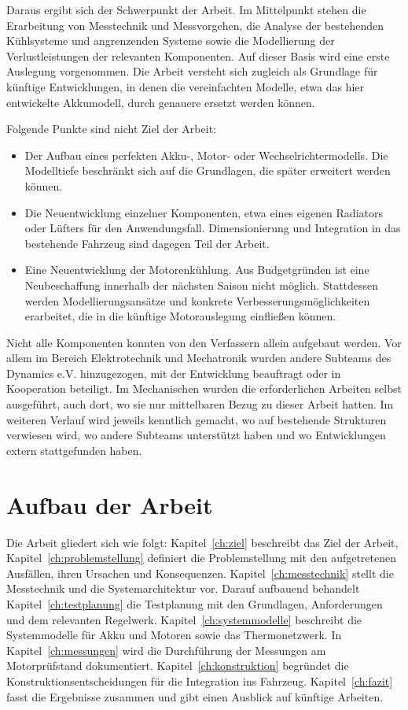 Daraus ergibt sich der Schwerpunkt der Arbeit. Im Mittelpunkt stehen die Erarbeitung von Messtechnik und Messvorgehen, die Analyse der bestehenden Kühlsysteme und angrenzenden Systeme sowie die Modellierung der Verlustleistungen der relevanten Komponenten. Auf dieser Basis wird eine erste Auslegung vorgenommen. Die Arbeit versteht sich zugleich als Grundlage für künftige Entwicklungen, in denen die vereinfachten Modelle, etwa das hier entwickelte Akkumodell, durch genauere ersetzt werden können.

Folgende Punkte sind nicht Ziel der Arbeit:
\begin{itemize}
    \item Der Aufbau eines perfekten Akku-, Motor- oder Wechselrichtermodells. Die Modelltiefe beschränkt sich auf die Grundlagen, die später erweitert werden können.
    \item Die Neuentwicklung einzelner Komponenten, etwa eines eigenen Radiators oder Lüfters für den Anwendungsfall. Dimensionierung und Integration in das bestehende Fahrzeug sind dagegen Teil der Arbeit.
    \item Eine Neuentwicklung der Motorenkühlung. Aus Budgetgründen ist eine Neubeschaffung innerhalb der nächsten Saison nicht möglich. Stattdessen werden Modellierungsansätze und konkrete Verbesserungsmöglichkeiten erarbeitet, die in die künftige Motorauslegung einfließen können.
\end{itemize}

Nicht alle Komponenten konnten von den Verfassern allein aufgebaut werden. Vor allem im Bereich Elektrotechnik und Mechatronik wurden andere Subteams des Dynamics e.V. hinzugezogen, mit der Entwicklung beauftragt oder in Kooperation beteiligt. Im Mechanischen wurden die erforderlichen Arbeiten selbst ausgeführt, auch dort, wo sie nur mittelbaren Bezug zu dieser Arbeit hatten. Im weiteren Verlauf wird jeweils kenntlich gemacht, wo auf bestehende Strukturen verwiesen wird, wo andere Subteams unterstützt haben und wo Entwicklungen extern stattgefunden haben.

\section{Aufbau der Arbeit}
\label{sec:einleitung_aufbau}

Die Arbeit gliedert sich wie folgt: Kapitel~\ref{ch:ziel} beschreibt das Ziel der Arbeit, Kapitel~\ref{ch:problemstellung} definiert die Problemstellung mit den aufgetretenen Ausfällen, ihren Ursachen und Konsequenzen. Kapitel~\ref{ch:messtechnik} stellt die Messtechnik und die Systemarchitektur vor. Darauf aufbauend behandelt Kapitel~\ref{ch:testplanung} die Testplanung mit den Grundlagen, Anforderungen und dem relevanten Regelwerk. Kapitel~\ref{ch:systemmodelle} beschreibt die Systemmodelle für Akku und Motoren sowie das Thermonetzwerk. In Kapitel~\ref{ch:messungen} wird die Durchführung der Messungen am Motorprüfstand dokumentiert. Kapitel~\ref{ch:konstruktion} begründet die Konstruktionsentscheidungen für die Integration ins Fahrzeug. Kapitel~\ref{ch:fazit} fasst die Ergebnisse zusammen und gibt einen Ausblick auf künftige Arbeiten.